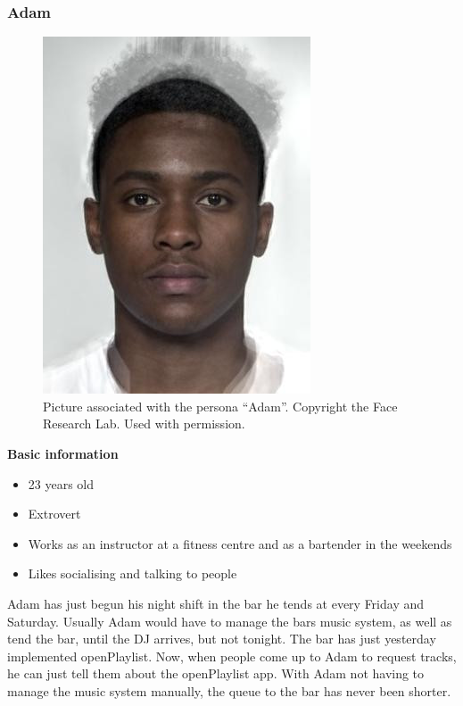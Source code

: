 \subsubsection{Adam}
\begin{figure} [h]
  \centering
  \includegraphics[]{Images/adam.jpg}
  \caption{Picture associated with the persona \enquote{Adam}. Copyright the Face Research Lab. Used with permission.}
  \label{fig:adam}
\end{figure}
\noindent\textbf{Basic information}
\begin{itemize}
\item 23 years old
\item Extrovert
\item Works as an instructor at a fitness centre and as a bartender in the weekends
\item Likes socialising and talking to people
\end{itemize}

Adam has just begun his night shift in the bar he tends at every Friday and Saturday. Usually Adam would have to manage the bars music system, as well as tend the bar, until the DJ arrives, but not tonight. The bar has just yesterday implemented openPlaylist. Now, when people come up to Adam to request tracks, he can just tell them about the openPlaylist app. With Adam not having to manage the music system manually, the queue to the bar has never been shorter.

